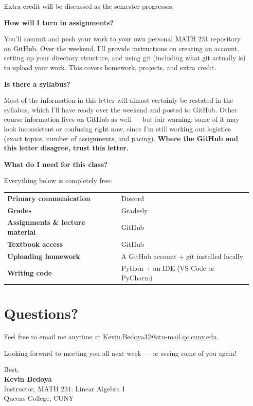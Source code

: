 \documentclass[11pt]{article}
\newcommand{\faq}[1]{\vspace{0.6em}\textbf{\color{accent}#1}\par\nobreak\vspace{0.15em}}
\begin{document}
Extra credit will be discussed as the semester progresses.

\faq{How will I turn in assignments?}
You'll commit and push your work to your own personal MATH 231 repository on GitHub. Over the weekend, I'll provide instructions on creating an account, setting up your directory structure, and using git (including what git actually is) to upload your work. This covers homework, projects, and extra credit.

\faq{Is there a syllabus?}
Most of the information in this letter will almost certainly be restated in the syllabus, which I'll have ready over the weekend and posted to GitHub. Other course information lives on GitHub as well --- but fair warning: some of it may look inconsistent or confusing right now, since I'm still working out logistics (exact topics, number of assignments, and pacing). \textbf{Where the GitHub and this letter disagree, trust this letter.}

\faq{What do I need for this class?}
Everything below is completely free:

\begin{center}
\begin{tabular}{@{}>{\bfseries}l l@{}}
\toprule
Primary communication & Discord \\
Grades & Gradesly \\
Assignments \& lecture material & GitHub \\
Textbook access & GitHub \\
Uploading homework & A GitHub account + git installed locally \\
Writing code & Python + an IDE (VS Code or PyCharm) \\
\bottomrule
\end{tabular}
\end{center}

\section{Questions?}

Feel free to email me anytime at \href{mailto:Kevin.Bedoya32@stu-mail.qc.cuny.edu}{Kevin.Bedoya32@stu-mail.qc.cuny.edu}.

\vspace{0.8em}
Looking forward to meeting you all next week --- or seeing some of you again!

\vspace{1.2em}
Best,\\[0.4em]
\textbf{Kevin Bedoya}\\
Instructor, MATH 231: Linear Algebra I\\
Queens College, CUNY
\end{document}
